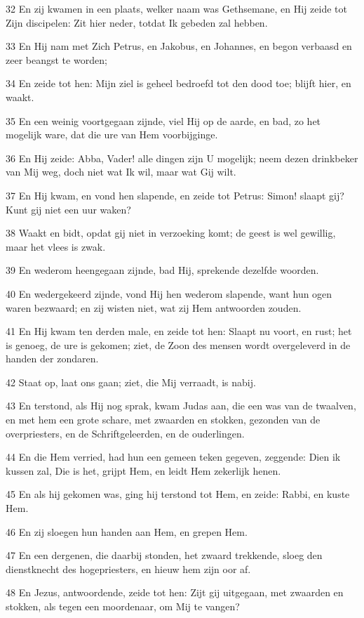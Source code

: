 \par 32 En zij kwamen in een plaats, welker naam was Gethsemane, en Hij zeide tot Zijn discipelen: Zit hier neder, totdat Ik gebeden zal hebben.
\par 33 En Hij nam met Zich Petrus, en Jakobus, en Johannes, en begon verbaasd en zeer beangst te worden;
\par 34 En zeide tot hen: Mijn ziel is geheel bedroefd tot den dood toe; blijft hier, en waakt.
\par 35 En een weinig voortgegaan zijnde, viel Hij op de aarde, en bad, zo het mogelijk ware, dat die ure van Hem voorbijginge.
\par 36 En Hij zeide: Abba, Vader! alle dingen zijn U mogelijk; neem dezen drinkbeker van Mij weg, doch niet wat Ik wil, maar wat Gij wilt.
\par 37 En Hij kwam, en vond hen slapende, en zeide tot Petrus: Simon! slaapt gij? Kunt gij niet een uur waken?
\par 38 Waakt en bidt, opdat gij niet in verzoeking komt; de geest is wel gewillig, maar het vlees is zwak.
\par 39 En wederom heengegaan zijnde, bad Hij, sprekende dezelfde woorden.
\par 40 En wedergekeerd zijnde, vond Hij hen wederom slapende, want hun ogen waren bezwaard; en zij wisten niet, wat zij Hem antwoorden zouden.
\par 41 En Hij kwam ten derden male, en zeide tot hen: Slaapt nu voort, en rust; het is genoeg, de ure is gekomen; ziet, de Zoon des mensen wordt overgeleverd in de handen der zondaren.
\par 42 Staat op, laat ons gaan; ziet, die Mij verraadt, is nabij.
\par 43 En terstond, als Hij nog sprak, kwam Judas aan, die een was van de twaalven, en met hem een grote schare, met zwaarden en stokken, gezonden van de overpriesters, en de Schriftgeleerden, en de ouderlingen.
\par 44 En die Hem verried, had hun een gemeen teken gegeven, zeggende: Dien ik kussen zal, Die is het, grijpt Hem, en leidt Hem zekerlijk henen.
\par 45 En als hij gekomen was, ging hij terstond tot Hem, en zeide: Rabbi, en kuste Hem.
\par 46 En zij sloegen hun handen aan Hem, en grepen Hem.
\par 47 En een dergenen, die daarbij stonden, het zwaard trekkende, sloeg den dienstknecht des hogepriesters, en hieuw hem zijn oor af.
\par 48 En Jezus, antwoordende, zeide tot hen: Zijt gij uitgegaan, met zwaarden en stokken, als tegen een moordenaar, om Mij te vangen?
